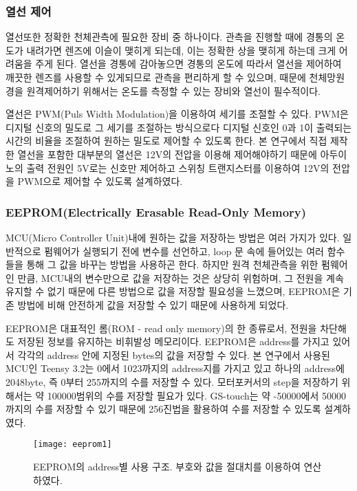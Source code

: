 
\subsubsection{열선 제어}
열선또한 정확한 천체관측에 필요한 장비 중 하나이다. 관측을 진행할 때에 경통의 온도가 내려가면 렌즈에 이슬이 맺히게 되는데, 이는 정확한 상을 맺히게 하는데 크게 어려움을 주게 된다. 열선을 경통에 감아놓으면 경통의 온도에 따라서 열선을 제어하여 깨끗한 렌즈를 사용할 수 있게되므로 관측을 편리하게 할 수 있으며, 때문에 천체망원경을 원격제어하기 위해서는 온도를 측정할 수 있는 장비와 열선이 필수적이다. 

열선은 PWM(Puls Width Modulation)을 이용하여 세기를 조절할 수 있다. PWM은 디지털 신호의 밀도로 그 세기를 조절하는 방식으로다 디지털 신호인 0과 1이 출력되는 시간의 비율을 조절하여 원하는 밀도로 제어할 수 있도록 한다. 본 연구에서 직접 제작한 열선을 포함한 대부분의 열선은 12V의 전압을 이용해 제어해야하기 때문에 아두이노의 출력 전원인 5V로는 신호만 제어하고 스위칭 트랜지스터를 이용하여 12V의 전압을 PWM으로 제어할 수 있도록 설계하였다.

\subsubsection{EEPROM(Electrically Erasable Read-Only Memory)}

MCU(Micro Controller Unit)내에 원하는 값을 저장하는 방법은 여러 가지가 있다. 일반적으로 펌웨어가 실행되기 전에 변수를 선언하고, loop 문 속에 들어있는 여러 함수들을 통해 그 값을 바꾸는 방법을 사용하곤 한다. 하지만 원격 천체관측을 위한 펌웨어인 만큼, MCU내의 변수만으로 값을 저장하는 것은 상당히 위험하며, 그 전원을 계속 유지할 수 없기 때문에 다른 방법으로 값을 저장할 필요성을 느꼈으며, EEPROM은 기존 방법에 비해 안전하게 값을 저장할 수 있기 때문에 사용하게 되었다.

EEPROM은 대표적인 롬(ROM - read only memory)의 한 종류로서, 전원을 차단해도 저장된 정보를 유지하는 비휘발성 메모리이다. EEPROM은 address를 가지고 있어서 각각의 address 안에 지정된 bytes의 값을 저장할 수 있다. 본 연구에서 사용된 MCU인 Teensy 3.2는 0에서 1023까지의 address지를 가지고 있고 하나의 address에 2048byte, 즉 0부터 255까지의 수를 저장할 수 있다. 모터포커서의 step을 저장하기 위해서는 약 100000범위의 수를 저장할 필요가 있다. GS-touch는 약 -50000에서 50000까지의 수를 저장할 수 있기 때문에 256진법을 활용하여 수를 저장할 수 있도록 설계하였다.
\begin{figure}[h]
	\begin{center}
		\texttt{[image: eeprom1]}
	\end{center}
	\caption{EEPROM의 address별 사용 구조. 부호와 값을 절대치를 이용하여 연산하였다.}
	\label{eeprom1}
\end{figure}


